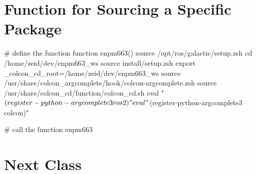 \documentclass[usenames,11,dvipsnames,svgnames,x11names,aspectratio=1610,bibref]{beamer}
\newcommand{\iconColor}[1]{\textcolor{iconColor}{#1}}
\newcommand{\iconWarningColor}[1]{\textcolor{iconWarningColor}{#1}}
\newcommand{\mydisclaimer}{{\color{disclaimer}{\footnotesize Lecture 1~}}}
\newcommand\doublerulefill{\leavevmode\leaders\vbox{\hrule width .1pt\kern1pt\hrule}\hfill\kern0pt }
\renewcommand\sec{{\cnordSix{\secname}\hfill\mydisclaimer} }
\newcommand{\mywarning}{\iconWarningColor{\faExclamationTriangle}\xspace}
\newcommand{\myinfo}{\iconColor{\faInfoCircle}\xspace}
\begin{document}

\section{Function for Sourcing a Specific Package}
\begin{frame}[fragile]{\sec}
\vspace*{\fill}
\begin{center} 

\begin{bashScriptList}
# define the function
function enpm663(){
  source /opt/ros/galactic/setup.zsh
  cd /home/zeid/dev/enpm663_ws
  source install/setup.zsh
  export _colcon_cd_root=/home/zeid/dev/enpm663_ws
  source /usr/share/colcon_argcomplete/hook/colcon-argcomplete.zsh
  source /usr/share/colcon_cd/function/colcon_cd.sh
  eval "$(register-python-argcomplete3 ros2)"
  eval "$(register-python-argcomplete3 colcon)"
}

# call the function
enpm663
\end{bashScriptList}

\end{center}
\vspace*{\fill}
\end{frame}




\section{Next Class}
\end{document}
